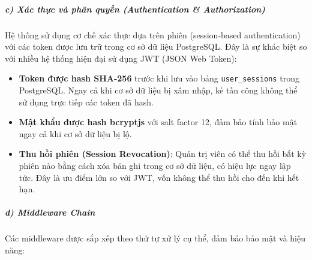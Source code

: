 \documentclass[13pt,a4paper]{extarticle}
\renewcommand{\\}{\thesislongtableorignewline\hline}%
\providecommand{\tightlist}{%
  \setlength{\itemsep}{0pt}\setlength{\parskip}{0pt}}
\begin{document}
\subparagraph{c) Xác thực và phân quyền (Authentication \&
Authorization)}\label{c-xuxe1c-thux1ef1c-vuxe0-phuxe2n-quyux1ec1n-authentication--authorization}

Hệ thống sử dụng cơ chế xác thực dựa trên phiên (session-based
authentication) với các token được lưu trữ trong cơ sở dữ liệu
PostgreSQL. Đây là sự khác biệt so với nhiều hệ thống hiện đại sử dụng
JWT (JSON Web Token):

\begin{itemize}
\tightlist
\item
  \textbf{Token được hash SHA-256} trước khi lưu vào bảng
  \texttt{user\_sessions} trong PostgreSQL. Ngay cả khi cơ sở dữ liệu bị
  xâm nhập, kẻ tấn công không thể sử dụng trực tiếp các token đã hash.
\item
  \textbf{Mật khẩu được hash bcryptjs} với salt factor 12, đảm bảo tính
  bảo mật ngay cả khi cơ sở dữ liệu bị lộ.
\item
  \textbf{Thu hồi phiên (Session Revocation)}: Quản trị viên có thể thu
  hồi bất kỳ phiên nào bằng cách xóa bản ghi trong cơ sở dữ liệu, có
  hiệu lực ngay lập tức. Đây là ưu điểm lớn so với JWT, vốn không thể
  thu hồi cho đến khi hết hạn.
\end{itemize}

\subparagraph{d) Middleware Chain}\label{d-middleware-chain}

Các middleware được sắp xếp theo thứ tự xử lý cụ thể, đảm bảo bảo mật và
hiệu năng:
\end{document}
